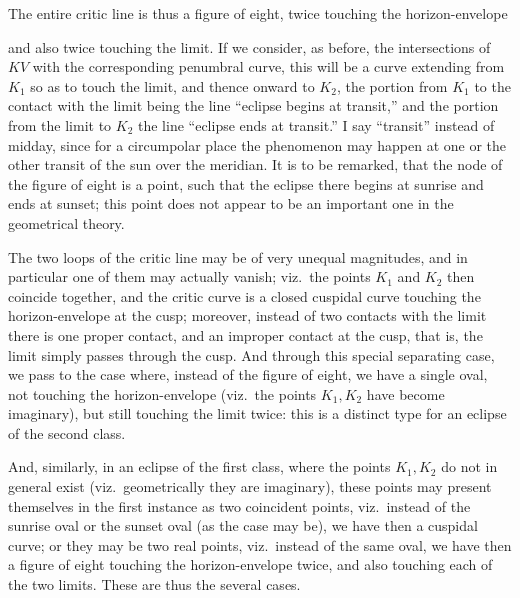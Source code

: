 \documentclass[11pt,a4paper]{article}
\begin{document}
\medskip

The entire critic line is thus a figure of eight, twice touching the horizon-envelope

\newpage


\noindent and also twice touching the limit. If we consider, as before, the intersections of $KV$ with the corresponding penumbral curve, this will be a curve extending from $K_{1}$ so as to touch the limit, and thence onward to $K_{2}$, the portion from $K_{1}$ to the contact with the limit being the line ``eclipse begins at transit,'' and the portion from the limit to $K_{2}$ the line ``eclipse ends at transit.'' I say ``transit'' instead of midday, since for a circumpolar place the phenomenon may happen at one or the other transit of the sun over the meridian. It is to be remarked, that the node of the figure of eight is a point, such that the eclipse there begins at sunrise and ends at sunset; this point does not appear to be an important one in the geometrical theory.

\medskip

The two loops of the critic line may be of very unequal magnitudes, and in particular one of them may actually vanish; viz.\ the points $K_{1}$ and $K_{2}$ then coincide together, and the critic curve is a closed cuspidal curve touching the horizon-envelope at the cusp; moreover, instead of two contacts with the limit there is one proper contact, and an improper contact at the cusp, that is, the limit simply passes through the cusp. And through this special separating case, we pass to the case where, instead of the figure of eight, we have a single oval, not touching the horizon-envelope (viz.\ the points $K_{1}, K_{2}$ have become imaginary), but still touching the limit twice: this is a distinct type for an eclipse of the second class.

\medskip

And, similarly, in an eclipse of the first class, where the points $K_{1}, K_{2}$ do not in general exist (viz.\ geometrically they are imaginary), these points may present themselves in the first instance as two coincident points, viz.\ instead of the sunrise oval or the sunset oval (as the case may be), we have then a cuspidal curve; or they may be two real points, viz.\ instead of the same oval, we have then a figure of eight touching the horizon-envelope twice, and also touching each of the two limits. These are thus the several cases.
\end{document}
